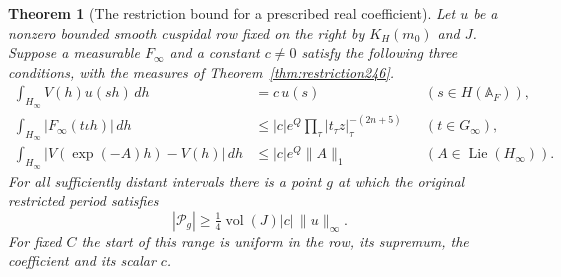 \documentclass[a4paper,11pt]{article}
\newtheorem{theorem}[proposition]{Theorem}
\theoremstyle{definition}
\theoremstyle{remark}
\numberwithin{equation}{section}
\begin{document}
\begin{theorem}[The restriction bound for a prescribed real coefficient]
\label{thm:initial247}
Let \(u\) be a nonzero bounded smooth cuspidal row fixed on the right
by \(K_H(m_0)\) and \(J\). Suppose a measurable \(F_\infty\) and a
constant \(c\ne0\) satisfy the following three conditions, with the
measures of Theorem~\ref{thm:restriction246}.
\begin{align*}
 \int_{H_\infty}V(h)u(s h)\,dh &= c\,u(s) &&(s\in H(\mathbb A_F)),\\
 \int_{H_\infty}|F_\infty(t\iota h)|\,dh
  &\le |c| e^Q\prod_\tau |t_\tau z|_\tau^{-(2n+5)} &&(t\in G_\infty),\\
 \int_{H_\infty}|V(\exp(-A)h)-V(h)|\,dh
  &\le |c| e^Q\|A\|_1 &&(A\in\operatorname{Lie}(H_\infty)).
\end{align*}
For all sufficiently distant intervals there is a point \(g\) at
which the original restricted period satisfies
\[
     |\mathcal P_g|\ge \tfrac14\operatorname{vol}(J)|c|\,\|u\|_\infty .
\]
For fixed \(C\) the start of this range is uniform in the row,
its supremum, the coefficient and its scalar \(c\).
\end{theorem}
\end{document}
